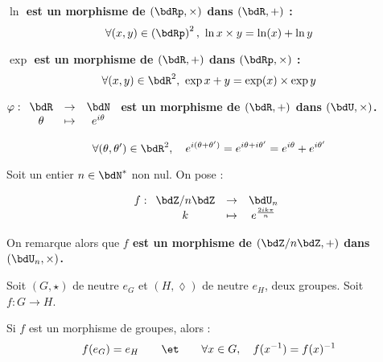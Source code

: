 \documentclass[a4paper,french,bookmarks]{article}
\begin{document}
\begin{example}{}{}

    \begin{enumerate}
        \ithand \bf{$\ln$ est un morphisme de $(\bdRp, \times)$ dans $(\bdR, +)$} :
        \[ \forall (x, y) \in \left(\bdRp\right)^2,\ \ln{x\times y} = \ln(x) + \ln{y}\]
        
        
        \ithand \bf{$\exp$ est un morphisme de $(\bdR, +)$ dans $(\bdRp, \times)$} :
        \[ \forall (x, y) \in \bdR^2,\ \exp{x + y} = \exp(x) \times  \exp{y}\]
        
        \ithand \bf{$\varphi : \begin{array}[t]{ccc}
            \bdR &\to& \bdN  \\
            \theta &\mapsto&e^{i\theta} 
        \end{array}$ est un morphisme de $(\bdR, +)$ dans $(\bdU, \times)$}.
        
        \[ \forall (\theta, \theta') \in \bdR^2,\quad e^{i(\theta + \theta')} = e^{i\theta + i\theta'} = e^{i\theta} + e^{i\theta'}\]
        
        \ithand Soit un entier $n \in \bdN^*$ non nul. On pose :
        
        \[ f : \begin{array}[t]{ccc}
            \bdZ/n\bdZ &\to& \bdU_n  \\
            k &\mapsto&e^{\frac{2ik\pi}{n}} 
        \end{array}\]
        
        On remarque alors que \bf{$f$ est un morphisme de $(\bdZ/n\bdZ, +)$ dans $(\bdU_n, \times)$}.
    \end{enumerate}
    
\end{example}

\begin{property}{}{}
    Soit  $(G, \star)$ de neutre $e_G$ et $(H, \lozenge)$ de neutre $e_H$, deux groupes. Soit $f: G \to H$. 
    
    Si $f$ est un morphisme de groupes, alors :
    \[ f(e_G) = e_H \qquad\et\qquad \forall x \in G,\quad f(x^{-1}) = f(x)^{-1}\]
\end{property}
\end{document}
